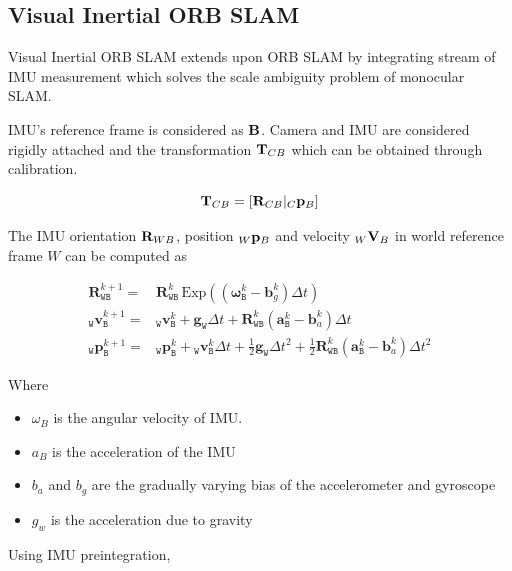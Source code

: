 \subsection{Visual Inertial ORB SLAM}

Visual Inertial ORB SLAM  extends upon ORB SLAM by integrating stream of IMU measurement which solves the scale ambiguity problem of monocular SLAM.

IMU's reference frame is considered as ${\bf B}$. Camera and IMU are considered rigidly attached and the transformation ${\bf T}_{CB}$ which can be obtained through calibration.

\begin{equation}
{\bf T}_{CB} = [{\bf R}_{CB} \vert _C{\bf p}_B]
\end{equation}

The IMU orientation ${\bf R}_{WB}$, position $_W{\bf p}_B$ and velocity $_W{\bf V}_B$ in world reference frame $W$ can be computed as

\begin{align} \mathbf {R}^{k+1}_\mathtt {WB} = & \mathbf {R}^{k}_\mathtt {WB} \, \text{Exp}\left(\left(\boldsymbol {\omega }^k_\mathtt {B} - \boldsymbol {b}^k_g\right)\Delta t\right) \nonumber\\ _\mathtt {W}\mathbf {v}^{k+1}_\mathtt {B} = & {_\mathtt {W}\mathbf {v}^{k}_\mathtt {B}} + \mathbf {g}_\mathtt {W} \Delta t + \mathbf {R}^{k}_\mathtt {WB} \left(\boldsymbol {a}^k_\mathtt {B} - \boldsymbol {b}^k_a\right)\Delta t \nonumber\\ _\mathtt {W}\mathbf {p}^{k+1}_\mathtt {B} = & {_\mathtt {W}\mathbf {p}^{k}_\mathtt {B}} + {_\mathtt {W}\mathbf {v}^{k}_\mathtt {B}} \Delta t + \frac{1}{2}\mathbf {g}_\mathtt {W} \Delta t^2 + \frac{1}{2} \mathbf {R}^{k}_\mathtt {WB} \left(\boldsymbol {a}^k_\mathtt {B} - \boldsymbol {b}^k_a\right)\Delta t^2 \end{align}

Where
\begin{itemize}
	\item ${\omega }_{B}$ is the angular velocity of IMU.
	\item ${a}_{B}$ is the acceleration of the IMU
	\item $b_a$ and $b_g$ are the gradually varying bias of the accelerometer and gyroscope
	\item $g_w$ is the acceleration due to gravity
\end{itemize}

Using IMU preintegration, 

